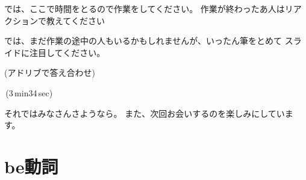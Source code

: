 \documentclass[book,jafontscale=0.9247]{jlreq}
\newenvironment{my_check}
  {\begin{itemize}
    \renewcommand\labelitemi{$\square\hspace{0.5em}$}} %
  {\end{itemize}}
\newcommand{\mySagyo}{%
\par%
\bigskip
では、ここで時間をとるので作業をしてください。
作業が終わったあ人はリアクションで教えてください\par%
\begin{minipage}[t]{.98\textwidth}
\mbox{}\hrulefill\mbox{}\par%
\mbox{}\hfill{}\raisebox{-.5\height}{作業}\hfill\mbox{}\par%
\mbox{}\hrulefill\mbox{}
\end{minipage}%
\par%
\bigskip%
では、まだ作業の途中の人もいるかもしれませんが、いったん筆をとめて
スライドに注目してください。%
\par%
\bigskip
}
\newcommand{\myStartLesson}{%
\vspace*{5pt}%
\noindent{}{\Large\gtfamily 授業スタート！}
\begin{my_check}
\item マイクON
\item カメラON\hspace{40pt}{\LARGE \ComputerMouse}
\end{my_check}
みなさん、こんにちは。
エデュオプちばの英語の授業にようこそ。\par
さて
音声は届いていますか？
なにかトラブルがあったら、チャットで教えてください。
どうぞよろしくお願いします。\par
きょうも暑いですね。
体調管理にはじゅうぶん気をつけてください。
みなさんも熱中症にならないように、
適切な水分補給をお願いします。
授業中でも差し支えありません。
遠慮なく水分を補給しながら、
リラックスして参加してください。\par
それでは授業にはいります。
\begin{my_check}
\item カメラOFF\hspace{40pt}{\LARGE \ComputerMouse}
\end{my_check}
}
\begin{document}
\mySagyo

(アドリブで答え合わせ)

\faVolumeUp\,(3\,min34\,sec)

{\large \ComputerMouse}


それではみなさんさようなら。
また、次回お会いするのを楽しみにしています。

\newpage


\chapter{be動詞}

%
%
%



%

%
%
%
%

%
%
\end{document}
